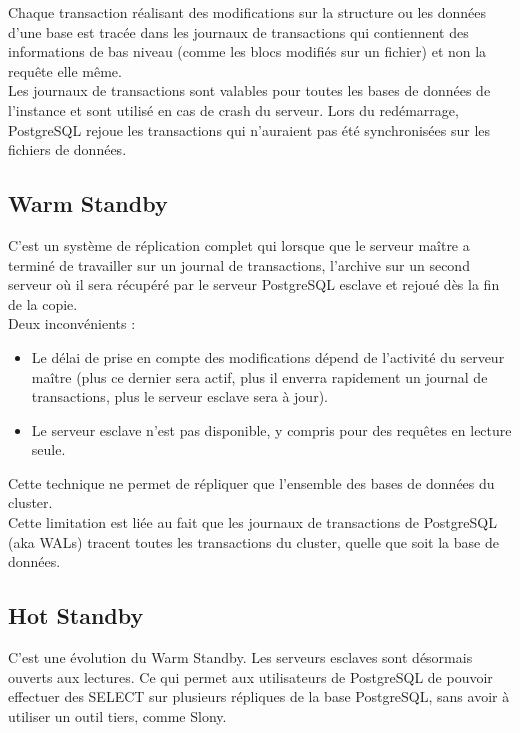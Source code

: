 \documentclass[12pt]{report}
\begin{document}
Chaque transaction réalisant des modifications sur la structure ou les données
d'une base est tracée dans les journaux de transactions qui contiennent des
informations de bas niveau (comme les blocs modifiés sur un fichier) et non la
requête elle même. \\

Les journaux de transactions sont valables pour toutes les bases de données de
l'instance et sont utilisé en cas de crash du serveur. Lors du redémarrage,
PostgreSQL rejoue les transactions qui n'auraient pas été synchronisées sur les
fichiers de données. \\


\subsection{Warm Standby}

C’est un système de réplication complet qui lorsque que le serveur maître a
terminé de travailler sur un journal de transactions, l’archive sur un second
serveur où il sera récupéré par le serveur PostgreSQL esclave et rejoué dès la
fin de la copie. \\

Deux inconvénients : \\

\begin{itemize}

\item Le délai de prise en compte des modifications dépend de l'activité du serveur
maître (plus ce dernier sera actif, plus il enverra rapidement un journal de
transactions, plus le serveur esclave sera à jour).
\item Le serveur esclave n'est pas disponible, y compris pour des requêtes en
  lecture seule. 
\end{itemize}

Cette technique ne permet de répliquer que l’ensemble des bases de données du
cluster.\\

Cette limitation est liée au fait que les journaux de transactions de PostgreSQL
(aka WALs) tracent toutes les transactions du cluster, quelle que soit la base
de données.\\
 

\subsection{Hot Standby}

C'est une évolution du Warm Standby. Les serveurs esclaves sont désormais
ouverts aux lectures. Ce qui permet aux utilisateurs de PostgreSQL de pouvoir
effectuer des SELECT sur plusieurs répliques de la base PostgreSQL, sans avoir à
utiliser un outil tiers, comme Slony.\\
\end{document}
